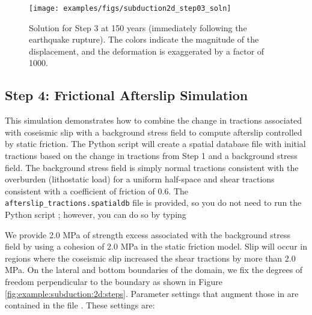\begin{figure}
  \texttt{[image: examples/figs/subduction2d\_step03\_soln]}
  \caption{Solution for Step 3 at 150 years (immediately following the earthquake
    rupture). The colors indicate the magnitude of the displacement, and
    the deformation is exaggerated by a factor of 1000.}
  \label{fig:example:subduction:2d:step03}
\end{figure}


\subsection{Step 4: Frictional Afterslip Simulation}

This simulation demonstrates how to combine the change in tractions
associated with coseismic slip with a background stress field to
compute afterslip controlled by static friction. The Python script
 will create a spatial database file
with initial tractions based on the change in tractions from Step 1
and a background stress field.  The background stress field is simply
normal tractions consistent with the overburden (lithostatic load) for
a uniform half-space and shear tractions consistent with a coefficient
of friction of 0.6.  The \texttt{afterslip\_tractions.spatialdb}
file is provided, so you do not need to run the Python script
; however, you can do so by typing
We provide 2.0 MPa of strength excess associated with the background
stress field by using a cohesion of 2.0 MPa in the static friction
model. Slip will occur in regions where the coseismic slip increased
the shear tractions by more than 2.0 MPa. On the lateral and bottom
boundaries of the domain, we fix the degrees of freedom perpendicular
to the boundary as shown in Figure \vref{fig:example:subduction:2d:steps}.
Parameter settings that augment those in  are
contained in the file . These settings are:
\begin{inventory}
\end{inventory}

